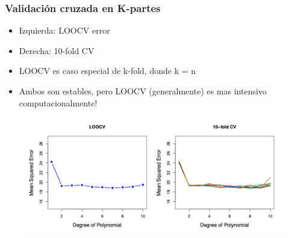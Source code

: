 \documentclass[
  shownotes,
  xcolor={svgnames},
  hyperref={colorlinks,citecolor=DarkBlue,linkcolor=DarkRed,urlcolor=DarkBlue}
  , aspectratio=169]{beamer}
\begin{document}
\begin{frame}[fragile]
\frametitle{Validación cruzada en K-partes}
\begin{itemize}
  \scriptsize
\item Izquierda: LOOCV  error 
\item Derecha: 10-fold CV 
\item LOOCV es caso especial de k-fold, donde k = n
\item Ambos son estables, pero LOOCV (generalmente) es mas intensivo computacionalmente! 
\end{itemize}

        \begin{figure}[H] \centering
            \captionsetup{justification=centering}
              \includegraphics[scale=0.5]{figures/fig54.png}
       \end{figure}
\end{frame}
\end{document}
